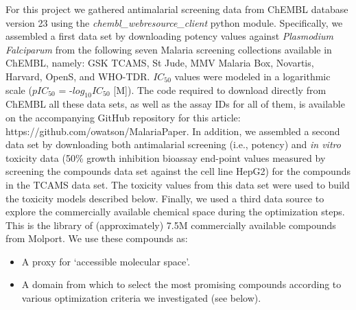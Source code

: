 \documentclass[journal=jacsat,manuscript=article]{achemso}
\begin{document}
For this project we gathered antimalarial screening data from ChEMBL database version 23 using the {\it chembl\_webresource\_client} python module\cite{Davies2015}.
Specifically, we assembled a first data set by downloading potency values against \textit{Plasmodium Falciparum} from the following seven Malaria screening collections available in ChEMBL, namely: GSK TCAMS, St Jude, MMV Malaria Box, Novartis, Harvard, OpenS, and WHO-TDR.
$IC_{50}$ values were modeled in a logarithmic scale ($pIC_{50}$ = -$log_{10} IC_{50}$ [M]). 
The code required to download directly from ChEMBL all these data sets, as well as the assay IDs for all of them, is available on the  accompanying GitHub repository for this article: https://github.com/owatson/MalariaPaper.
\newline
\newline
In addition, we assembled a second data set by downloading both antimalarial screening (i.e., potency) and {\it in vitro} toxicity data (50\% growth inhibition bioassay end-point values measured by screening the compounds data set against the cell line HepG2) for the compounds in the TCAMS data set.
The toxicity values from this data set were used to build the toxicity models described below.
\newline
\newline
Finally, we used a third data source to explore the commercially available chemical space during the optimization steps.  This is the library of (approximately) 7.5M commercially available compounds from Molport.  We use these compounds as: \begin{itemize}
    \item A proxy for `accessible molecular space'.
    \item A domain from which to select the most promising compounds according to various optimization criteria we investigated (see below).
\end{itemize}
\end{document}

